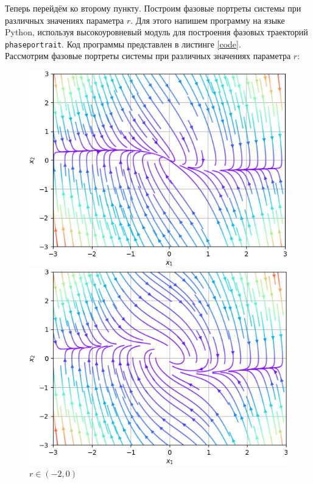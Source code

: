 \documentclass[a4paper]{article}
\begin{document}
\vspace{0.5em}
Теперь перейдём ко второму пункту. Построим фазовые портреты системы при различных значениях параметра $r$. Для этого напишем программу на языке Python, используя высокоуровневый модуль для построения фазовых траекторий \texttt{phaseportrait}. Код программы представлен в листинге \ref{code}.\\[0.5em]
Рассмотрим фазовые портреты системы при различных значениях параметра $r$:
\begin{figure}[H]
    \centering
    \begin{minipage}{0.395\textwidth}
        \includegraphics[width=\textwidth]{sources/r<=-2.png}
        \caption{$r \in \left( -\infty, -2\right]$}
    \end{minipage}
    \hspace{2em}
    \begin{minipage}{0.395\textwidth}
        \includegraphics[width=\textwidth]{sources/-2<r<0.png}
        \caption{$r \in \left( -2, 0\right)$}
    \end{minipage}
\end{figure}
\end{document}
